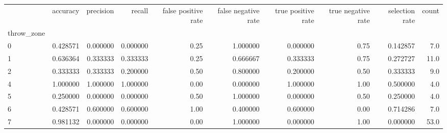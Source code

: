 \begin{tabular}{lrrrrrrrrr}
\toprule
{} &  accuracy &  precision &    recall &  false positive rate &  false negative rate &  true positive rate &  true negative rate &  selection rate &  count \\
throw\_zone &           &            &           &                      &                      &                     &                     &                 &        \\
\midrule
0          &  0.428571 &   0.000000 &  0.000000 &                 0.25 &             1.000000 &            0.000000 &                0.75 &        0.142857 &    7.0 \\
1          &  0.636364 &   0.333333 &  0.333333 &                 0.25 &             0.666667 &            0.333333 &                0.75 &        0.272727 &   11.0 \\
2          &  0.333333 &   0.333333 &  0.200000 &                 0.50 &             0.800000 &            0.200000 &                0.50 &        0.333333 &    9.0 \\
4          &  1.000000 &   1.000000 &  1.000000 &                 0.00 &             0.000000 &            1.000000 &                1.00 &        0.500000 &    4.0 \\
5          &  0.250000 &   0.000000 &  0.000000 &                 0.50 &             1.000000 &            0.000000 &                0.50 &        0.250000 &    4.0 \\
6          &  0.428571 &   0.600000 &  0.600000 &                 1.00 &             0.400000 &            0.600000 &                0.00 &        0.714286 &    7.0 \\
7          &  0.981132 &   0.000000 &  0.000000 &                 0.00 &             1.000000 &            0.000000 &                1.00 &        0.000000 &   53.0 \\
\bottomrule
\end{tabular}
